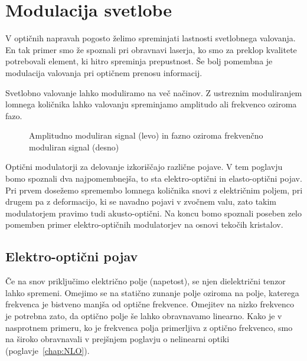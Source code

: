 
\chapter{Modulacija svetlobe}

V optičnih napravah pogosto želimo spreminjati lastnosti svetlobnega
valovanja. En tak primer smo že spoznali pri obravnavi laserja,
ko smo za preklop kvalitete potrebovali element, ki hitro spreminja prepustnost. 
Še bolj pomembna je modulacija valovanja pri optičnem prenosu informacij.

Svetlobno valovanje lahko moduliramo na več načinov. Z ustreznim moduliranjem
lomnega količnika lahko valovanju spreminjamo amplitudo ali frekvenco oziroma fazo. 
\begin{figure}[h]
\centering
\def\svgwidth{140truemm} 

\caption{Amplitudno moduliran signal (levo) in fazno oziroma frekvenčno moduliran signal (desno)
}
\label{fig:amfm}
\end{figure}

Optični modulatorji za delovanje izkoriščajo različne pojave. V tem poglavju bomo spoznali dva
najpomembnejša, to sta elektro-optični in elasto-optični pojav. Pri prvem 
dosežemo spremembo lomnega količnika snovi z električnim poljem, pri drugem pa z 
deformacijo, ki se navadno pojavi v zvočnem valu, zato takim modulatorjem pravimo tudi
akusto-optični. Na koncu bomo spoznali poseben zelo pomemben primer elektro-optičnih modulatorjev
na osnovi tekočih kristalov.

\section{Elektro-optični pojav}
Če na snov priključimo električno polje (napetost), se njen dielektrični tenzor lahko spremeni.
Omejimo se na statično zunanje polje oziroma na polje, katerega frekvenca 
je bistveno manjša od optične frekvence. Omejitev na nizko frekvenco je potrebna zato, 
da optično polje še lahko obravnavamo linearno. Kako je v nasprotnem primeru, ko je frekvenca
polja primerljiva z optično frekvenco, smo na široko obravnavali v prejšnjem poglavju o
nelinearni optiki (poglavje~\ref{chap:NLO}).

